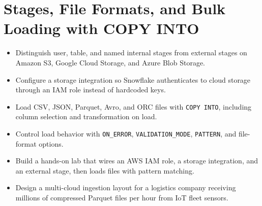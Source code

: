 \chapter{Stages, File Formats, and Bulk Loading with COPY INTO}
%
\begin{objectives}
\begin{itemize}
    \item Distinguish user, table, and named internal stages from external stages on Amazon S3, Google Cloud Storage, and Azure Blob Storage.
    \item Configure a storage integration so Snowflake authenticates to cloud storage through an IAM role instead of hardcoded keys.
    \item Load CSV, JSON, Parquet, Avro, and ORC files with \texttt{COPY INTO}, including column selection and transformation on load.
    \item Control load behavior with \texttt{ON\_ERROR}, \texttt{VALIDATION\_MODE}, \texttt{PATTERN}, and file-format options.
    \item Build a hands-on lab that wires an AWS IAM role, a storage integration, and an external stage, then loads files with pattern matching.
    \item Design a multi-cloud ingestion layout for a logistics company receiving millions of compressed Parquet files per hour from IoT fleet sensors.
\end{itemize}
\end{objectives}

